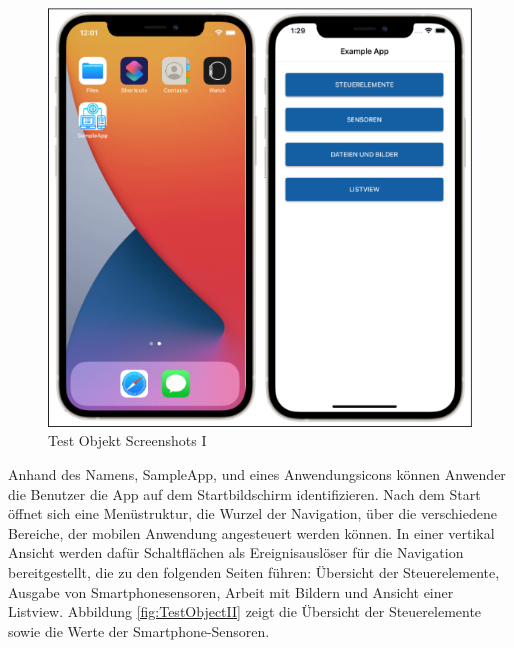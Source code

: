 \begin{figure}[!ht]
 \includegraphics[width=\textwidth,keepaspectratio]{Images/Screenshot/AppIconAndMenu.png}
 \caption{Test Objekt Screenshots I}
 \label{fig:TestObjectI}
\end{figure}

Anhand des Namens,  SampleApp,  und eines Anwendungsicons können Anwender die Benutzer die App auf dem Startbildschirm identifizieren.  Nach dem Start öffnet sich eine Menüstruktur,  die Wurzel der Navigation, über die verschiedene Bereiche, der mobilen Anwendung angesteuert werden können.  In einer vertikal Ansicht werden dafür Schaltflächen als Ereignisauslöser für die Navigation bereitgestellt,  die zu den folgenden Seiten führen: Übersicht der Steuerelemente,  Ausgabe von Smartphonesensoren,  Arbeit mit Bildern und Ansicht einer Listview.   Abbildung \ref{fig:TestObjectII} zeigt die Übersicht der Steuerelemente sowie die Werte der Smartphone-Sensoren.

